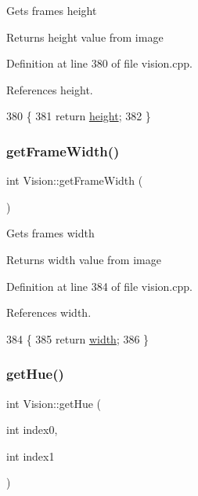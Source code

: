 Gets frame\textquotesingle{}s height \begin{DoxyReturn}{Returns}
height value from image 
\end{DoxyReturn}


Definition at line 380 of file vision.\+cpp.



References height.


\begin{DoxyCode}
380                            \{
381     \textcolor{keywordflow}{return} \hyperlink{class_vision_aa6f52191ab439505b6156835594f1861}{height};
382 \}
\end{DoxyCode}
\mbox{\label{class_vision_ac807f56dd7e64d74d65893b7f13b9d3b}} 
\subsubsection{\texorpdfstring{get\+Frame\+Width()}{getFrameWidth()}}
{\footnotesize\ttfamily int Vision\+::get\+Frame\+Width (\begin{DoxyParamCaption}{ }\end{DoxyParamCaption})}

Gets frame\textquotesingle{}s width \begin{DoxyReturn}{Returns}
width value from image 
\end{DoxyReturn}


Definition at line 384 of file vision.\+cpp.



References width.


\begin{DoxyCode}
384                           \{
385     \textcolor{keywordflow}{return} \hyperlink{class_vision_ac82a1da77a8b08d112e5c4688bd70c3d}{width};
386 \}
\end{DoxyCode}
\mbox{\label{class_vision_adc6eb838fa27551430516e80a547a6bd}} 
\subsubsection{\texorpdfstring{get\+Hue()}{getHue()}}
{\footnotesize\ttfamily int Vision\+::get\+Hue (\begin{DoxyParamCaption}\item[{int}]{index0,  }\item[{int}]{index1 }\end{DoxyParamCaption})}

